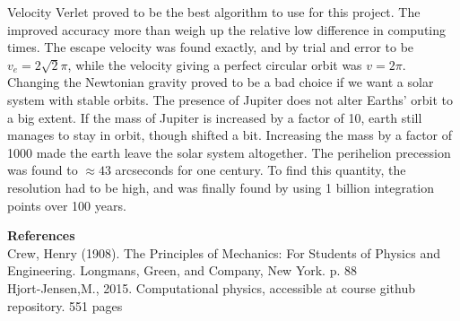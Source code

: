 \documentclass[10pt,a4paper]{article}
\begin{document}
\noindent Velocity Verlet proved to be the best algorithm to use for this project. The improved accuracy more than weigh up the relative low difference in computing times. The escape velocity was found exactly, and by trial and error to be $v_e = 2\sqrt{2}\pi$, while the velocity giving a perfect circular orbit was $v=2\pi$. Changing the Newtonian gravity proved to be a bad choice if we want a solar system with stable orbits. The presence of Jupiter does not alter Earths' orbit to a big extent. If the mass of Jupiter is increased by a factor of 10, earth still manages to stay in orbit, though shifted a bit. Increasing the mass by a factor of 1000 made the earth leave the solar system altogether. The perihelion precession was found to $\approx 43$ arcseconds for one century. To find this quantity, the resolution had to be high, and was finally found by using 1 billion integration points over 100 years. 








\newpage
{\LARGE\bf
References
}\\
Crew, Henry (1908). The Principles of Mechanics: For Students of Physics and Engineering. Longmans, Green, and Company, New York. p. 88\\

\noindent Hjort-Jensen,M., 2015. Computational physics, accessible at course github
repository. 551 pages
\end{document}
